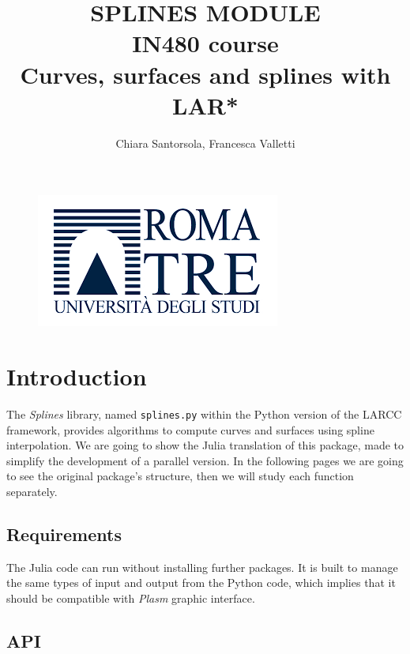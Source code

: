 \documentclass[a4paper,11pt]{article}
\begin{document}
\begin{figure}
\centering
\includegraphics[scale=0.50]{logo.jpg}
\end{figure}

	\title{SPLINES MODULE\\ \vspace{0.5cm} IN480 course\\ \vspace{0.5cm} Curves, surfaces and splines with LAR*}
	\vspace{0.5cm}
	\author{Chiara Santorsola, Francesca Valletti}
\maketitle

\newpage
\tableofcontents
\newpage

\section{Introduction}
The \emph{Splines} library, named \texttt{splines.py} within the Python version of the LARCC framework, provides algorithms to compute curves and surfaces using spline interpolation. We are going to show the Julia translation of this package, made to simplify the development of a parallel version. In the following pages we are going to see the original package's structure, then we will study each function separately.

\subsection{Requirements}
The Julia code can run without installing further packages. It is built to manage the same types of input and output from the Python code, which implies that it should be compatible with \emph{Plasm} graphic interface.

\subsection{API}
\end{document}
